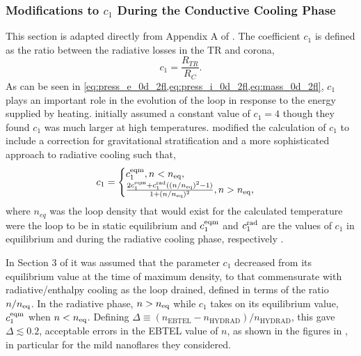 \subsubsection{Modifications to $c_1$ During the Conductive Cooling Phase}\label{sec:c1-correction}

This section is adapted directly from Appendix A of \citet[\autoref{ch:inferring_hot_plasma} of this thesis]{barnes_inference_2016}. The coefficient $c_1$ is defined as the ratio between the radiative losses in the TR and corona,
\begin{equation}\label{eq:c1_def}
    c_1 = \frac{R_{TR}}{R_C}.
\end{equation}
As can be seen in \autoref{eq:press_e_0d_2fl,eq:press_i_0d_2fl,eq:mass_0d_2fl}, $c_1$ plays an important role in the evolution of the loop in response to the energy supplied by heating. \citet{klimchuk_highly_2008} initially assumed a constant value of $c_1=4$ though they found $c_1$ was much larger at high temperatures. \citet{cargill_enthalpy-based_2012} modified the calculation of $c_1$ to include a correction for gravitational stratification and a more sophisticated approach to radiative cooling such that,
\begin{equation}\label{eq:c1_mod1}
    c_1 =
    \begin{cases}
        c_1^\textup{eqm}, n < n_\textup{eq}, \\
        \frac{2c_1^\textup{eqm} + c_1^\textup{rad}((n/n_\textup{eq})^2 - 1)}{1 + (n/n_\textup{eq})^2}, n > n_\textup{eq},
    \end{cases}
\end{equation} 
where $n_{eq}$ was the loop density that would exist for the calculated temperature were the loop to be in static equilibrium \citep[Equation 17 of][]{cargill_enthalpy-based_2012} and $c_1^\textup{eqm}$ and $c_1^\textup{rad}$ are the values of $c_1$ in equilibrium and during the radiative cooling phase, respectively \citep[see Equations 12 and 16 of][]{cargill_enthalpy-based_2012}. 

In Section 3 of \citet{cargill_enthalpy-based_2012} it was assumed that the parameter $c_1$ decreased from its equilibrium value at the time of maximum density, to that commensurate with radiative/enthalpy cooling as the loop drained, defined in terms of the ratio $n/n_\textup{eq}$. In the radiative phase, $n > n_\textup{eq}$ while $c_1$ takes on its equilibrium value, $c_1^\textup{eqm}$ when $n < n_\textup{eq}$. Defining $\Delta\equiv(n_{\mathrm{EBTEL}} - n_{\mathrm{HYDRAD}})/n_{\mathrm{HYDRAD}}$, this gave $\Delta\lesssim0.2$, acceptable errors in the EBTEL value of $n$, as shown in the figures in \citet{cargill_enthalpy-based_2012}, in particular for the mild nanoflares they considered.

